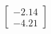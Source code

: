 \documentclass[preview]{standalone}
\begin{document}
\begin{align*}
\begin{bmatrix} -2.14 \\ -4.21 \end{bmatrix}
\end{align*}
\end{document}

